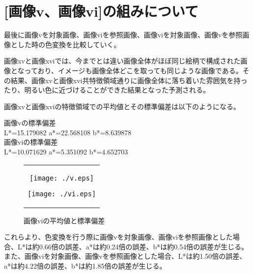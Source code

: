 \section{[画像v、画像vi]の組みについて}
最後に画像vを対象画像、画像viを参照画像、画像viを対象画像、画像vを参照画像とした時の色変換を比較していく。\par
画像xvと画像xviでは、今までとは違い画像全体がほぼ同じ絵柄で構成された画像となっており、イメージも画像全体どこを取っても同じような画像である。その結果、画像xvと画像xvi共特徴領域通りに画像全体に落ち着いた雰囲気を持ったり、明るい色に近づけることができた結果となった予測される。\par
画像xvと画像xviの特徴領域での平均値とその標準偏差は以下のようになる。
\begin{screen}
画像vの標準偏差\\
L*=15.179082 a*=22.568108 b*=8.639878\\
画像viの標準偏差\\
L*=10.071629 a*=5.351092 b*=4.652703
  \end{screen}
\begin{figure}[htbp]
  \begin{center}
    \begin{tabular}{c}

      \begin{minipage}{0.45\hsize}
        \begin{center}
          \texttt{[image: ./v.eps]}
          \caption{画像vの平均値と標準偏差}
          \label{fig:seininhsv}
        \end{center}
      \end{minipage}

      \begin{minipage}{0.45\hsize}
        \begin{center}
          \texttt{[image: ./vi.eps]}
          \caption{画像viの平均値と標準偏差}
          \label{fig:kinninhsv}
        \end{center}
      \end{minipage}


    \end{tabular}
  \end{center}
\end{figure}
\par
これらより、色変換を行う際に画像vを対象画像、画像viを参照画像とした場合、L*は約0.66倍の誤差、a*は約0.24倍の誤差、b*は約0.54倍の誤差が生じる。また、画像viを対象画像、画像vを参照画像とした場合、L*は約1.50倍の誤差、a*は約4.22倍の誤差、b*は約1.85倍の誤差が生じる。
